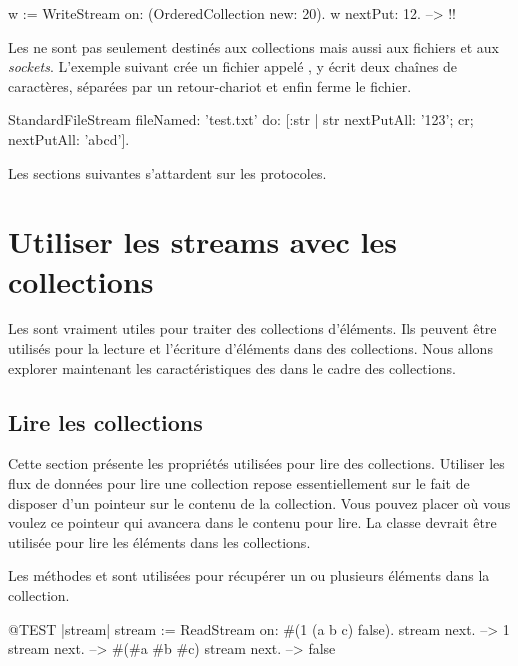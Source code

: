 \documentclass[a4paper,10pt,twoside]{book}
\begin{document}
\begin{code}{}
w := WriteStream on: (OrderedCollection new: 20).
w nextPut: 12. -->  !!
\end{code}

Les \streams ne sont pas seulement destinés aux collections mais
aussi aux fichiers et aux \emph{sockets}.
L'exemple suivant crée un fichier appelé \mbox{,} 
y écrit deux chaînes de caractères, séparées par un retour-chariot et enfin ferme le fichier.

\begin{code}{}
StandardFileStream
  fileNamed: 'test.txt'
  do: [:str | str
                nextPutAll: '123';
                cr;
                nextPutAll: 'abcd'].
\end{code}

Les sections suivantes s'attardent sur les protocoles.

\section{Utiliser les streams avec les collections}

Les \streams sont vraiment utiles pour traiter des collections d'éléments.
Ils peuvent être utilisés pour la lecture et l'écriture d'éléments
dans des collections. Nous allons explorer maintenant les caractéristiques
des \streams dans le cadre des collections.

\subsection{Lire les collections}

Cette section présente les propriétés utilisées pour lire des collections. 
Utiliser les flux de données pour lire une collection repose essentiellement 
sur le fait de disposer d'un pointeur sur le contenu de la collection.
Vous pouvez placer où vous voulez ce pointeur qui avancera dans le contenu pour lire.
La classe  devrait être utilisée pour lire les éléments dans 
les collections.

Les méthodes  et  
sont utilisées pour récupérer un ou plusieurs éléments dans la collection.

\begin{code}{@TEST |stream|}
stream := ReadStream on: #(1 (a b c) false).
stream next. -->   1
stream next. -->   #(#a #b #c)
stream next. -->   false
\end{code}
\end{document}
